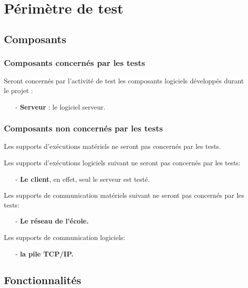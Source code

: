 
\chapter{Périmètre de test}
	\section{Composants}
		\subsection{Composants concernés par les tests}
		
Seront concernés par l'activité de test les composants logiciels développés durant le projet : 
\begin{itemize}
\item[-]\textbf{Serveur} : le logiciel serveur.
\end{itemize}


		\subsection{Composants non concernés par les tests}
		
Les supports d'exécutions matériels ne seront pas concernés par les tests.

Les supports d'exécutions logiciels suivant ne seront pas concernés par les tests:
\begin{itemize}
\item[-]\textbf{Le client}, en effet, seul le serveur est testé.\\
\end{itemize}

Les supports de communication matériels suivant ne seront pas concernés par les tests: 
\begin{itemize}
\item[-]\textbf{Le réseau de l'école.}\\
\end{itemize}

Les supports de communication logiciels: 
\begin{itemize}
\item[-]\textbf{la pile TCP/IP.}
\end{itemize}
\newpage
		
	\section{Fonctionnalités}
	\label{refpFonctionnalités}


